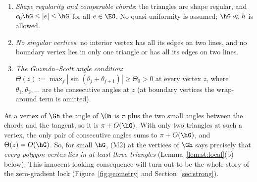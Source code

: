 \begin{assumption}[Mesh]\label{ass:mesh}\leavevmode
\begin{enumerate}[label=(M\arabic*),start=0]
\item \emph{Shape regularity and comparable chords}: the triangles are shape regular, and $c_0\hG\le|e|\le\hG$ for all $e\in\EG$. No quasi-uniformity is assumed; $\hG\ll h$ is allowed.
\item \emph{No singular vertices}: no interior vertex has all its edges on two lines, and no boundary vertex lies in only one triangle or has all its edges on two lines.
\item \emph{The Guzm\'an--Scott angle condition}: $\Theta(z):=\max_j|\sin(\theta_j+\theta_{j+1})|\ge\Theta_0>0$ at every vertex $z$, where $\theta_1,\theta_2,\dots$ are the consecutive angles at $z$ \cite{GuzmanScott2019} (at boundary vertices the wrap-around term is omitted).
\end{enumerate}
\end{assumption}
At a vertex of $\Gh$ the angle of $\Oh$ is $\pi$ plus the two small angles between the chords and the tangent, so it is $\pi+O(\hG)$. With only two triangles at such a vertex, the only pair of consecutive angles sums to $\pi+O(\hG)$, and $\Theta(z)=O(\hG)$. So, for small $\hG$, (M2) at the vertices of $\Gh$ says precisely that \emph{every polygon vertex lies in at least three triangles} (Lemma~\ref{lem:st:local}(b) below). This innocent-looking consequence will turn out to be the whole story of the zero-gradient lock (Figure~\ref{fig:geometry} and Section~\ref{sec:strong}).

